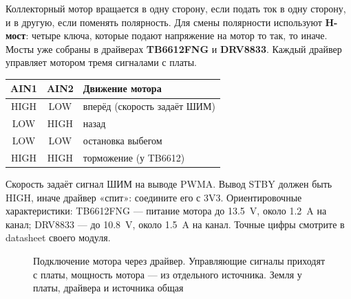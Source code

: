 Коллекторный мотор вращается в одну сторону, если подать ток в одну сторону, и в другую, если
поменять полярность. Для смены полярности используют \textbf{H-мост}: четыре ключа, которые
подают напряжение на мотор то так, то иначе. Мосты уже собраны в драйверах \textbf{TB6612FNG} и
\textbf{DRV8833}. Каждый драйвер управляет мотором тремя сигналами с платы.

\begin{center}\small
\begin{tabular}{@{}ccl@{}}
\toprule
AIN1 & AIN2 & Движение мотора \\
\midrule
HIGH & LOW  & вперёд (скорость задаёт ШИМ) \\
LOW  & HIGH & назад \\
LOW  & LOW  & остановка выбегом \\
HIGH & HIGH & торможение (у TB6612) \\
\bottomrule
\end{tabular}
\end{center}

Скорость задаёт сигнал ШИМ на выводе PWMA. Вывод STBY должен быть HIGH, иначе драйвер «спит»: соедините
его с 3V3. Ориентировочные характеристики: TB6612FNG --- питание мотора до \SI{13.5}{V}, около
\SI{1.2}{A} на канал; DRV8833 --- до \SI{10.8}{V}, около \SI{1.5}{A} на канал. Точные цифры смотрите в datasheet своего модуля.

\begin{figure}[H]
\centering
{}
\caption{Подключение мотора через драйвер. Управляющие сигналы приходят с платы, мощность мотора ---
из отдельного источника. Земля у платы, драйвера и источника общая}
\end{figure}


